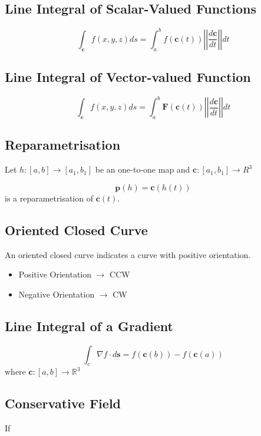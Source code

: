 \documentclass[11pt, oneside]{article}
\renewcommand{\vec}[1]{\mathbf{#1}}
\begin{document}
\subsection{Line Integral of Scalar-Valued Functions}

\begin{equation}
  \int_{\vec{c}}f(x,y,z)ds = \int^b_af(\vec{c}(t))\left|\left|\frac{d\vec{c}}{dt}\right|\right|dt
\end{equation}
\subsection{Line Integral of Vector-valued Function}
\begin{equation}
\int_{\vec{c}}f(x,y,z)ds = \int^b_a\vec{F}(\vec{c}(t))\left|\left|\frac{d\vec{c}}{dt}\right|\right|dt  
\end{equation}
\subsection{Reparametrisation}
Let $h:[a,b]\rightarrow[a_1,b_1]$ be an one-to-one map and $\vec{c}:[a_1,b_1]\rightarrow R^3$

\begin{equation}
  \vec{p}(h) = \vec{c}(h(t))
\end{equation}
is a reparametrisation of $\vec{c}(t)$.

\subsection{Oriented Closed Curve}
An oriented closed curve indicates a curve with positive orientation.

\begin{itemize}
  \item Positive Orientation $\rightarrow$ CCW
  \item Negative Orientation $\rightarrow$ CW
\end{itemize}

\subsection{Line Integral of a Gradient}
\begin{equation}
  \int_c\nabla f\cdot d\vec{s} = f(\vec{c}(b)) - f(\vec{c}(a))
\end{equation}
where $\vec{c}:[a,b] \rightarrow \mathbb{R}^3$

\subsection{Conservative Field}
If 
\end{document}
